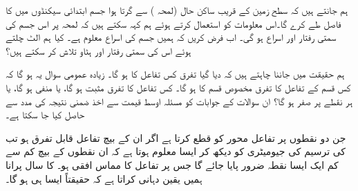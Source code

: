 ہم جانتے ہیں کہ سطح زمین کے قریب  ساکن حال (لمحہ ) سے گرتا ہوا  جسم ابتدائی  سیکنڈوں میں   کا فاصل طے کرے گا۔اس معلومات کو استعمال کرتے ہوئے ہم کہہ سکتے ہیں کہ لمحہ  پر  اس جسم کی سمتی رفتار  اور اسراع
  ہو گی۔ اب فرض کریں کہ ہمیں جسم کی اسراع معلوم ہے۔ کیا ہم الٹ چلتے ہوئے اس کی سمتی رفتار اور ہٹاو تلاش کر سکتے ہیں؟

ہم حقیقت میں جاننا چاہتے ہیں کہ دیا گیا تفرق کس تفاعل کا ہو گا۔ زیادہ عمومی سوال یہ ہو گا کہ کس قسم کے تفاعل کا تفرق مخصوص قسم کا ہو گا۔ کس تفاعل کا تفرق مثبت ہو گا، یا منفی ہو گا، یا ہر نقطے پر صفر ہو گا؟ ان سوالات کے جوابات کو مسئلہ اوسط قیمت سے اخذ ضمنی نتیجہ  کی مدد سے حاصل کیا جا سکتا ہے۔

جن دو نقطوں پر تفاعل  محور  کو قطع  کرتا ہے اگر ان کے بیچ تفاعل قابل تفرق ہو تب  کی  ترسیم کی جیومیٹری کو دیکھ کر ایسا معلوم ہوتا ہے کہ ان نقطوں کے بیچ کم سے کم ایک ایسا نقطہ ضرور پایا جائے گا جس پر تفاعل کا مماس افقی ہو۔   کا  سال پرانا  ہمیں یقین دہانی کراتا ہے کہ حقیقتاً ایسا ہی ہو گا۔

